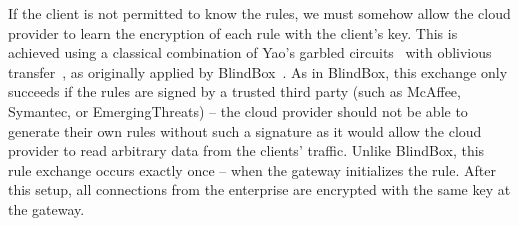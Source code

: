 If the client is not permitted to know the rules, we must somehow allow the cloud provider to learn the encryption of each rule with the client's key. This is achieved using a classical combination of Yao's garbled circuits~\cite{Yao86} with oblivious transfer~\cite{Naor-Pinkas}, as originally applied by BlindBox~\cite{blindbox}.
As in BlindBox, this exchange only succeeds if the rules are signed by a trusted third party (such as McAffee, Symantec, or EmergingThreats) -- the cloud provider should not be able to generate their own rules without such a signature as it would allow the cloud provider to read arbitrary data from the clients' traffic.
Unlike BlindBox, this rule exchange occurs exactly once -- when the gateway initializes the rule. 
After this setup, all connections from the enterprise are encrypted with the same key at the gateway.

